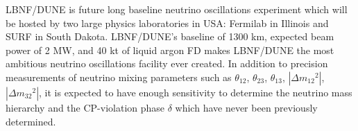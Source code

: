 




LBNF/DUNE is future long baseline neutrino oscillations experiment which will be hosted by two large physics laboratories in USA: Fermilab in Illinois and SURF in South Dakota. LBNF/DUNE's baseline of 1300 km, expected beam power of 2 MW, and 40 kt of liquid argon FD makes LBNF/DUNE the most ambitious neutrino oscillations facility ever created. In addition to precision measurements of neutrino mixing parameters such as $\theta_{12}$, $\theta_{23}$, $\theta_{13}$, $|\Delta{m_{12}}^2|$, $|\Delta{m_{32}}^2|$, it is expected to have enough sensitivity to determine the neutrino mass hierarchy and the CP-violation phase $\delta$ which have never been previously determined.\\ \\
